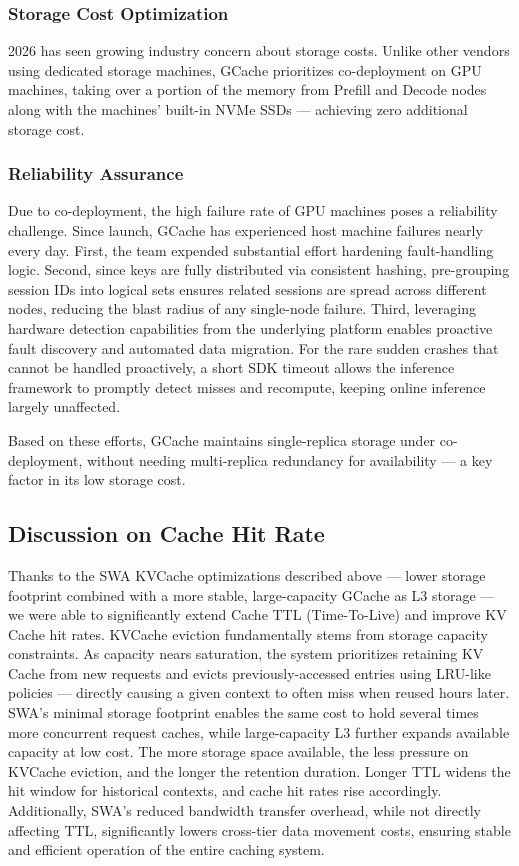 \subsubsection{Storage Cost Optimization}

2026 has seen growing industry concern about storage costs. Unlike other vendors using dedicated storage machines, GCache prioritizes co-deployment on GPU machines, taking over a portion of the memory from Prefill and Decode nodes along with the machines' built-in NVMe SSDs --- achieving zero additional storage cost.

\subsubsection{Reliability Assurance}

Due to co-deployment, the high failure rate of GPU machines poses a reliability challenge. Since launch, GCache has experienced host machine failures nearly every day. First, the team expended substantial effort hardening fault-handling logic. Second, since keys are fully distributed via consistent hashing, pre-grouping session IDs into logical sets ensures related sessions are spread across different nodes, reducing the blast radius of any single-node failure. Third, leveraging hardware detection capabilities from the underlying platform enables proactive fault discovery and automated data migration. For the rare sudden crashes that cannot be handled proactively, a short SDK timeout allows the inference framework to promptly detect misses and recompute, keeping online inference largely unaffected.

Based on these efforts, GCache maintains single-replica storage under co-deployment, without needing multi-replica redundancy for availability --- a key factor in its low storage cost.

\subsection{Discussion on Cache Hit Rate}

Thanks to the SWA KVCache optimizations described above --- lower storage footprint combined with a more stable, large-capacity GCache as L3 storage --- we were able to significantly extend Cache TTL (Time-To-Live) and improve KV Cache hit rates. KVCache eviction fundamentally stems from storage capacity constraints. As capacity nears saturation, the system prioritizes retaining KV Cache from new requests and evicts previously-accessed entries using LRU-like policies --- directly causing a given context to often miss when reused hours later. SWA's minimal storage footprint enables the same cost to hold several times more concurrent request caches, while large-capacity L3 further expands available capacity at low cost. The more storage space available, the less pressure on KVCache eviction, and the longer the retention duration. Longer TTL widens the hit window for historical contexts, and cache hit rates rise accordingly. Additionally, SWA's reduced bandwidth transfer overhead, while not directly affecting TTL, significantly lowers cross-tier data movement costs, ensuring stable and efficient operation of the entire caching system.

